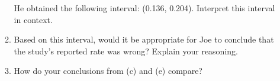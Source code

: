\documentclass[
  letterpaper,
  DIV=11,
  numbers=noendperiod]{scrartcl}
\begin{document}
\begin{enumerate}
\begin{enumerate}
    He obtained the following interval: (0.136, 0.204). Interpret this
    interval in context.
  \item
    Based on this interval, would it be appropriate for Joe to conclude
    that the study's reported rate was wrong? Explain your reasoning.
  \item
    How do your conclusions from (c) and (e) compare?
  \end{enumerate}
\end{enumerate}
\end{document}
